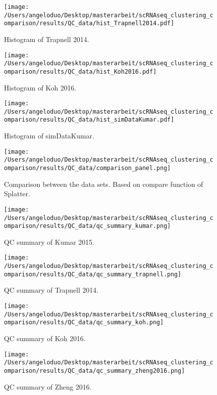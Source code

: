 \documentclass[12pt, a4paper]{article}\usepackage[]{graphicx}\usepackage[]{color}
\begin{document}
\begin{figure}[!h]
\texttt{[image: /Users/angeloduo/Desktop/masterarbeit/scRNAseq\_clustering\_comparison/results/QC\_data/hist\_Trapnell2014.pdf]}
\caption{Histogram of Trapnell 2014. }
\label{fig:histtrap}
\end{figure}

\begin{figure}[!h]
\texttt{[image: /Users/angeloduo/Desktop/masterarbeit/scRNAseq\_clustering\_comparison/results/QC\_data/hist\_Koh2016.pdf]}
\caption{Histogram of Koh 2016. }
\label{fig:histkoh}
\end{figure}


\begin{figure}[!h]
\texttt{[image: /Users/angeloduo/Desktop/masterarbeit/scRNAseq\_clustering\_comparison/results/QC\_data/hist\_simDataKumar.pdf]}
\caption{Histogram of simDataKumar. }
\label{fig:histsim}
\end{figure}



\begin{figure}[!h]
\texttt{[image: /Users/angeloduo/Desktop/masterarbeit/scRNAseq\_clustering\_comparison/results/QC\_data/comparison\_panel.png]}
\caption{Comparison between the data sets. Based on compare function of Splatter.}
\label{fig:compare}
\end{figure}

\begin{figure}[!h]
\texttt{[image: /Users/angeloduo/Desktop/masterarbeit/scRNAseq\_clustering\_comparison/results/QC\_data/qc\_summary\_kumar.png]}
\caption{QC summary of Kumar 2015. }
\label{fig:qckumar}
\end{figure}

\begin{figure}[!h]
\texttt{[image: /Users/angeloduo/Desktop/masterarbeit/scRNAseq\_clustering\_comparison/results/QC\_data/qc\_summary\_trapnell.png]}
\caption{QC summary of Trapnell 2014. }
\label{fig:qctrapnell}
\end{figure}

\begin{figure}[!h]
\texttt{[image: /Users/angeloduo/Desktop/masterarbeit/scRNAseq\_clustering\_comparison/results/QC\_data/qc\_summary\_koh.png]}
\caption{QC summary of Koh 2016. }
\label{fig:qckoh}
\end{figure}

\begin{figure}[!h]
\texttt{[image: /Users/angeloduo/Desktop/masterarbeit/scRNAseq\_clustering\_comparison/results/QC\_data/qc\_summary\_zheng2016.png]}
\caption{QC summary of Zheng 2016. }
\label{fig:qczheng}
\end{figure}
\end{document}
